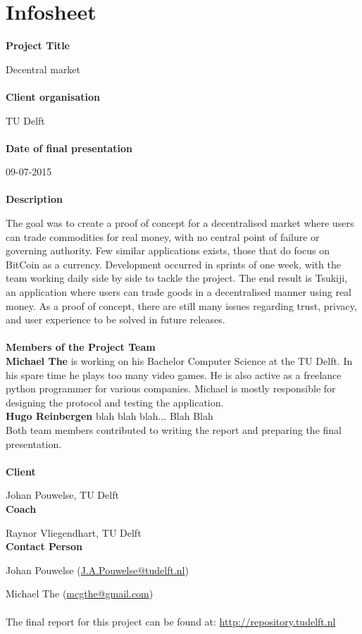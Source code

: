 \section{Infosheet}

\textbf{Project Title}

Decentral market
\\
\\
\textbf{Client organisation}

TU Delft
\\
\\
\textbf{Date of final presentation}

09-07-2015
\\
\\
\textbf{Description}

The goal was to create a proof of concept for a decentralised market where users can trade commodities for real money, with no central point of failure or governing authority.
Few similar applications exists, those that do focus on BitCoin as a currency.
Development occurred in sprints of one week, with the team working daily side by side to tackle the project.
The end result is Tsukiji, an application where users can trade goods in a decentralised manner using real money.
As a proof of concept, there are still many issues regarding trust, privacy, and user experience to be solved in future releases.
\\
\\
\textbf{Members of the Project Team}
\\

\textbf{Michael The} is working on his Bachelor Computer Science at the TU Delft.
In his spare time he plays too many video games.
He is also active as a freelance python programmer for various companies.
Michael is mostly responsible for designing the protocol and testing the application.
\\

\textbf{Hugo Reinbergen} blah blah blah...
Blah
Blah
\\

Both team members contributed to writing the report and preparing the final presentation.
\\
\\
\textbf{Client}

Johan Pouwelse, TU Delft
\\
\textbf{Coach}

Raynor Vliegendhart, TU Delft
\\
\textbf{Contact Person}

Johan Pouwelse (\href{mailto:J.A.Pouwelse@tudelft.nl}{J.A.Pouwelse@tudelft.nl})

Michael The	(\href{mailto:mcgthe@gmail.com}{mcgthe@gmail.com})
\\
\\
The final report for this project can be found at: \url{http://repository.tudelft.nl}